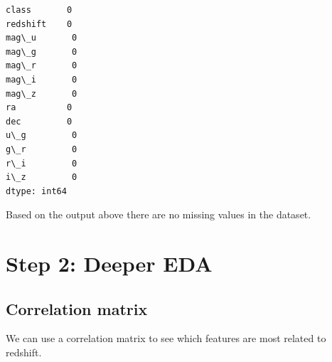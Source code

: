 \documentclass[11pt]{article}
\begin{document}
    \begin{Verbatim}[commandchars=\\\{\}]
class       0
redshift    0
mag\_u       0
mag\_g       0
mag\_r       0
mag\_i       0
mag\_z       0
ra          0
dec         0
u\_g         0
g\_r         0
r\_i         0
i\_z         0
dtype: int64
    \end{Verbatim}

    Based on the output above there are no missing values in the dataset.

\hypertarget{step-2-deeper-eda}{%
\section{Step 2: Deeper EDA}\label{step-2-deeper-eda}}

\hypertarget{correlation-matrix}{%
\subsection{Correlation matrix}\label{correlation-matrix}}

We can use a correlation matrix to see which features are most related
to redshift.
\end{document}
